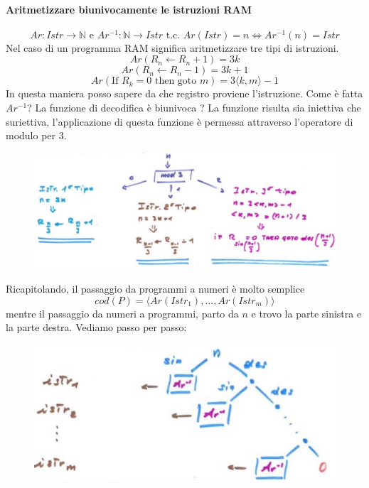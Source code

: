 \documentclass{article}
\begin{document}
\paragraph{Aritmetizzare biunivocamente le istruzioni RAM}
$$Ar:Istr\rightarrow\mathbb{N}\text{ e }Ar^{-1}:\mathbb{N}\rightarrow Istr\text{ t.c. }
    Ar(Istr)=n\Leftrightarrow Ar^{-1}(n)=Istr$$
Nel caso di un programma RAM significa aritmetizzare tre tipi di istruzioni.
$$Ar(R_n\leftarrow R_n+1)=3k$$
$$Ar(R_n\leftarrow R_n-1)=3k+1$$
$$Ar(\text{If }R_k=0\text{ then goto }m)=3\langle k,m\rangle-1$$
In questa maniera posso sapere da che registro proviene l'istruzione.
Come è fatta $Ar^{-1}$? La funzione di decodifica è biunivoca ? La funzione
risulta sia iniettiva che suriettiva, l'applicazione di questa funzione è permessa
attraverso l'operatore di modulo per $3$.
\begin{figure}[H]
    \centering
    \includegraphics[scale=0.4]{images/mod3.png}
\end{figure}

Ricapitolando, il passaggio da programmi a numeri è molto semplice
$$cod(P)=\langle Ar(Istr_1),...,Ar(Istr_m)\rangle$$
mentre il passaggio da numeri a programmi, parto da $n$ e trovo la parte sinistra e
la parte destra. Vediamo passo per passo:

\begin{figure}[H]
    \centering
    \includegraphics[scale=0.5]{images/decod_bin.png}
\end{figure}
\end{document}
